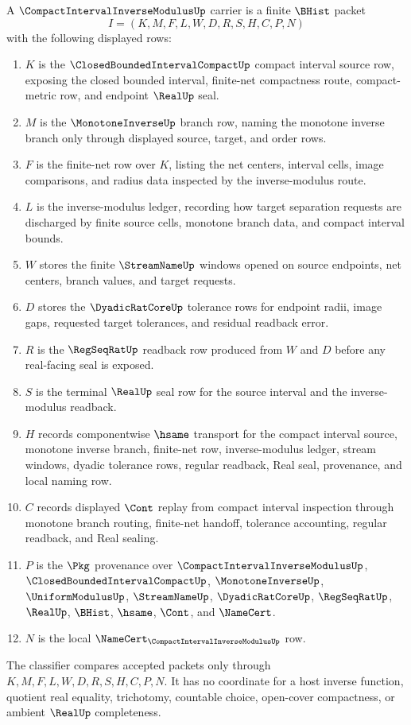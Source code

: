 \begin{definition}
\label{def:compact-interval-inverse-modulus-carrier}
A $\CompactIntervalInverseModulusUp$ carrier is a finite $\BHist$ packet
$$
I=(K,M,F,L,W,D,R,S,H,C,P,N)
$$
with the following displayed rows:
\begin{enumerate}
\item $K$ is the $\ClosedBoundedIntervalCompactUp$ compact interval source row, exposing the closed bounded interval, finite-net compactness route, compact-metric row, and endpoint $\RealUp$ seal.
\item $M$ is the $\MonotoneInverseUp$ branch row, naming the monotone inverse branch only through displayed source, target, and order rows.
\item $F$ is the finite-net row over $K$, listing the net centers, interval cells, image comparisons, and radius data inspected by the inverse-modulus route.
\item $L$ is the inverse-modulus ledger, recording how target separation requests are discharged by finite source cells, monotone branch data, and compact interval bounds.
\item $W$ stores the finite $\StreamNameUp$ windows opened on source endpoints, net centers, branch values, and target requests.
\item $D$ stores the $\DyadicRatCoreUp$ tolerance rows for endpoint radii, image gaps, requested target tolerances, and residual readback error.
\item $R$ is the $\RegSeqRatUp$ readback row produced from $W$ and $D$ before any real-facing seal is exposed.
\item $S$ is the terminal $\RealUp$ seal row for the source interval and the inverse-modulus readback.
\item $H$ records componentwise $\hsame$ transport for the compact interval source, monotone inverse branch, finite-net row, inverse-modulus ledger, stream windows, dyadic tolerance rows, regular readback, Real seal, provenance, and local naming row.
\item $C$ records displayed $\Cont$ replay from compact interval inspection through monotone branch routing, finite-net handoff, tolerance accounting, regular readback, and Real sealing.
\item $P$ is the $\Pkg$ provenance over $\CompactIntervalInverseModulusUp$, $\ClosedBoundedIntervalCompactUp$, $\MonotoneInverseUp$, $\UniformModulusUp$, $\StreamNameUp$, $\DyadicRatCoreUp$, $\RegSeqRatUp$, $\RealUp$, $\BHist$, $\hsame$, $\Cont$, and $\NameCert$.
\item $N$ is the local $\NameCert_{\CompactIntervalInverseModulusUp}$ row.
\end{enumerate}
The classifier compares accepted packets only through $K,M,F,L,W,D,R,S,H,C,P,N$. It has no coordinate for a host inverse function, quotient real equality, trichotomy, countable choice, open-cover compactness, or ambient $\RealUp$ completeness.
\end{definition}

